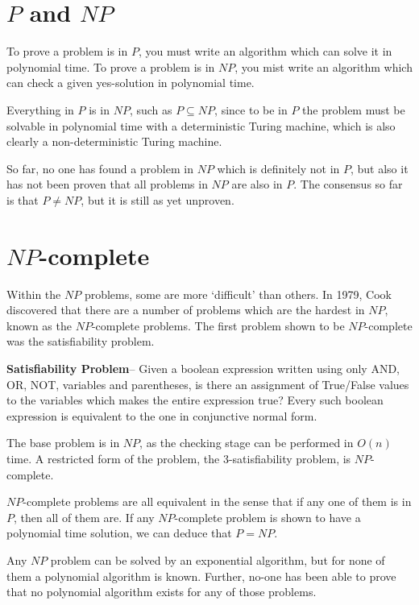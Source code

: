 
\section*{$P$ and $NP$}

To prove a problem is in $P$, you must write an algorithm which can solve it in polynomial time. To prove a problem is
 in $NP$, you mist write an algorithm which can check a given yes-solution in polynomial time.

Everything in $P$ is in $NP$, such as $P \subseteq NP$, since to be in $P$ the problem must be solvable in polynomial
 time with a deterministic Turing machine, which is also clearly a non-deterministic Turing machine.

So far, no one has found a problem in $NP$ which is definitely not in $P$, but also it has not been proven that all
 problems in $NP$ are also in $P$. The consensus so far is that $P \neq NP$, but it is still as yet unproven.

\section*{$NP$-complete}

Within the $NP$ problems, some are more `difficult' than others. In 1979, Cook discovered that there are a number of
 problems which are the hardest in $NP$, known as the $NP$-complete problems. The first problem shown to be
 $NP$-complete was the satisfiability problem.

\textbf{Satisfiability Problem}-- Given a boolean expression written using only AND, OR, NOT, variables and parentheses,
 is there an assignment of True/False values to the variables which makes the entire expression true? Every such boolean
 expression is equivalent to the one in conjunctive normal form.

The base problem is in $NP$, as the checking stage can be performed in $O(n)$ time. A restricted form of the problem,
 the 3-satisfiability problem, is $NP$-complete.

$NP$-complete problems are all equivalent in the sense that if any one of them is in $P$, then all of them are. If any
 $NP$-complete problem is shown to have a polynomial time solution, we can deduce that $P = NP$.

Any $NP$ problem can be solved by an exponential algorithm, but for none of them a polynomial algorithm is known.
 Further, no-one has been able to prove that no polynomial algorithm exists for any of those problems.

